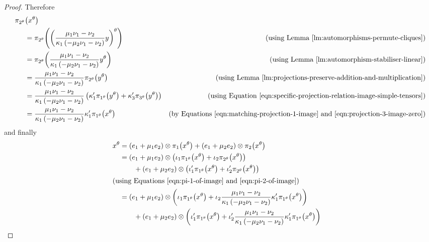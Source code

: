 \documentclass[ALCO, Unicode]{cedram}
\begin{document}
\begin{proof}
Therefore
\begin{align}
    \pi_{2^\theta}&{\left(x^\theta \right)}  \notag \\
    &= \pi_{2^\theta}{\left(\left(\frac{\mu_1 \nu_1 - \nu_2}{\kappa_1 \left(-\mu_2 \nu_1 - \nu_2 \right)} y \right)^\theta \right)} &\text{(using Lemma~\ref{lm:automorphisms-permute-cliques})} \notag \\
    &= \pi_{2^\theta}{\left(\frac{\mu_1 \nu_1 - \nu_2}{\kappa_1 \left(-\mu_2 \nu_1 - \nu_2 \right)} y^\theta \right)} &\text{(using Lemma~\ref{lm:automorphism-stabiliser-linear})} \notag \\
    &= \frac{\mu_1 \nu_1 - \nu_2}{\kappa_1 \left(-\mu_2 \nu_1 - \nu_2 \right)} \pi_{2^\theta}{\left(y^\theta \right)} &\text{(using Lemma~\ref{lm:projections-preserve-addition-and-multiplication})} \notag \\
    &= \frac{\mu_1 \nu_1 - \nu_2}{\kappa_1 \left(-\mu_2 \nu_1 - \nu_2 \right)} \left(\kappa'_1 \pi_{1^\theta}{\left(y^\theta \right)} + \kappa'_3 \pi_{3^\theta}{\left(y^\theta \right)}\right) &\text{(using Equation \eqref{eqn:specific-projection-relation-image-simple-tensors})} \notag \\
    &= \frac{\mu_1 \nu_1 - \nu_2}{\kappa_1 \left(-\mu_2 \nu_1 - \nu_2 \right)} \kappa'_1 \pi_{1^\theta}{\left(x^\theta \right)} &\text{(by Equations \eqref{eqn:matching-projection-1-image} and \eqref{eqn:projection-3-image-zero})} \label{eqn:pi-2-image}
\end{align}
and finally
\begin{align*}
    x^\theta &= \left(e_1 + \mu_1 e_2 \right) \otimes \pi_1{\left(x^\theta \right)} + \left(e_1 + \mu_2 e_2 \right) \otimes \pi_2{\left(x^\theta \right)} \\
    &= \left(e_1 + \mu_1 e_2 \right) \otimes \left(\iota_1 \pi_{1^\theta}{\left(x^\theta \right)} + \iota_2 \pi_{2^\theta}{\left(x^\theta \right)}\right) \\
    &\ \ \ \ \ \ + \left(e_1 + \mu_2 e_2 \right) \otimes \left(\iota'_1 \pi_{1^\theta}{\left(x^\theta \right)} + \iota'_2 \pi_{2^\theta}{\left(x^\theta \right)}\right)  & \\
    \intertext{(using Equations \eqref{eqn:pi-1-of-image} and \eqref{eqn:pi-2-of-image})}
    &= \left(e_1 + \mu_1 e_2 \right) \otimes \left(\iota_1 \pi_{1^\theta}{\left(x^\theta \right)} + \iota_2 \frac{\mu_1 \nu_1 - \nu_2}{\kappa_1 \left(-\mu_2 \nu_1 - \nu_2 \right)} \kappa'_1 \pi_{1^\theta}{\left(x^\theta \right)}\right) \\
    &\ \ \ \ \ \ + \left(e_1 + \mu_2 e_2 \right) \otimes \left(\iota'_1 \pi_{1^\theta}{\left(x^\theta \right)} + \iota'_2 \frac{\mu_1 \nu_1 - \nu_2}{\kappa_1 \left(-\mu_2 \nu_1 - \nu_2 \right)} \kappa'_1 \pi_{1^\theta}{\left(x^\theta \right)}\right) & \\

\end{align*}
\end{proof}
\end{document}
